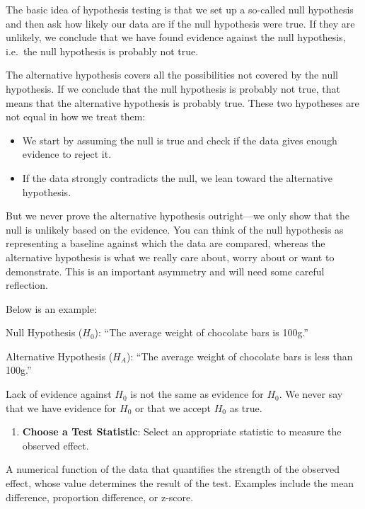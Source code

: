 \documentclass[
  letterpaper,
]{book}
\providecommand{\tightlist}{%
  \setlength{\itemsep}{0pt}\setlength{\parskip}{0pt}}\usepackage{longtable,booktabs,array}
\begin{document}
The basic idea of hypothesis testing is that we set up a so-called null
hypothesis and then ask how likely our data are if the null hypothesis
were true. If they are unlikely, we conclude that we have found evidence
against the null hypothesis, i.e.~the null hypothesis is probably not
true.

The alternative hypothesis covers all the possibilities not covered by
the null hypothesis. If we conclude that the null hypothesis is probably
not true, that means that the alternative hypothesis is probably true.
These two hypotheses are not equal in how we treat them:

\begin{itemize}
\item
  We start by assuming the null is true and check if the data gives
  enough evidence to reject it.
\item
  If the data strongly contradicts the null, we lean toward the
  alternative hypothesis.
\end{itemize}

But we never prove the alternative hypothesis outright---we only show
that the null is unlikely based on the evidence. You can think of the
null hypothesis as representing a baseline against which the data are
compared, whereas the alternative hypothesis is what we really care
about, worry about or want to demonstrate. This is an important
asymmetry and will need some careful reflection.

Below is an example:

Null Hypothesis (\(H_0\)): ``The average weight of chocolate bars is
100g.''

Alternative Hypothesis (\(H_A\)): ``The average weight of chocolate bars
is less than 100g.''

Lack of evidence against \(H_0\) is not the same as evidence for
\(H_0\). We never say that we have evidence for \(H_0\) or that we
accept \(H_0\) as true.

\begin{enumerate}
\def\labelenumi{\arabic{enumi}.}
\setcounter{enumi}{1}
\tightlist
\item
  \textbf{Choose a Test Statistic}: Select an appropriate statistic to
  measure the observed effect.
\end{enumerate}

A numerical function of the data that quantifies the strength of the
observed effect, whose value determines the result of the test. Examples
include the mean difference, proportion difference, or z-score.
\end{document}
